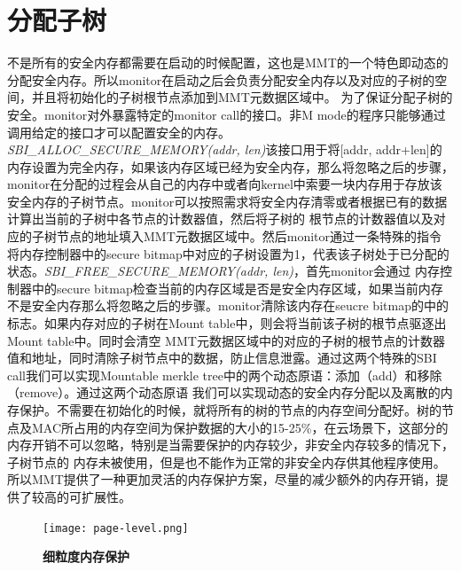 \section{分配子树}
不是所有的安全内存都需要在启动的时候配置，这也是MMT的一个特色即动态的分配安全内存。所以monitor在启动之后会负责分配安全内存以及对应的子树的空间，并且将初始化的子树根节点添加到MMT元数据区域中。
为了保证分配子树的安全。monitor对外暴露特定的monitor call的接口。非M mode的程序只能够通过调用给定的接口才可以配置安全的内存。\emph{SBI\_ALLOC\_SECURE\_MEMORY(addr, len)}该接口用于将[addr, addr+len]的内存设置为完全内存，如果该内存区域已经为安全内存，那么将忽略之后的步骤，
monitor在分配的过程会从自己的内存中或者向kernel中索要一块内存用于存放该安全内存的子树节点。monitor可以按照需求将安全内存清零或者根据已有的数据计算出当前的子树中各节点的计数器值，然后将子树的
根节点的计数器值以及对应的子树节点的地址填入MMT元数据区域中。然后monitor通过一条特殊的指令将内存控制器中的secure bitmap中对应的子树设置为1，代表该子树处于已分配的状态。\emph{SBI\_FREE\_SECURE\_MEMORY(addr, len)}，首先monitor会通过
内存控制器中的secure bitmap检查当前的内存区域是否是安全内存区域，如果当前内存不是安全内存那么将忽略之后的步骤。monitor清除该内存在seucre bitmap的中的标志。如果内存对应的子树在Mount table中，则会将当前该子树的根节点驱逐出Mount table中。同时会清空
MMT元数据区域中的对应的子树的根节点的计数器值和地址，同时清除子树节点中的数据，防止信息泄露。通过这两个特殊的SBI call我们可以实现Mountable merkle tree中的两个动态原语：添加（add）和移除（remove）。通过这两个动态原语
我们可以实现动态的安全内存分配以及离散的内存保护。不需要在初始化的时候，就将所有的树的节点的内存空间分配好。树的节点及MAC所占用的内存空间为保护数据的大小的15-25\%，在云场景下，这部分的内存开销不可以忽略，特别是当需要保护的内存较少，非安全内存较多的情况下，子树节点的
内存未被使用，但是也不能作为正常的非安全内存供其他程序使用。所以MMT提供了一种更加灵活的内存保护方案，尽量的减少额外的内存开销，提供了较高的可扩展性。

\begin{figure}[!htp]
  \centering
  \texttt{[image: page-level.png]}
  \caption{\textbf{细粒度内存保护}}
 \label{fig:page-level.png}
\end{figure}
